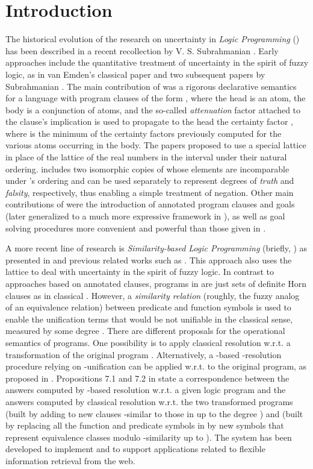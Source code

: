 \documentclass{sigplanconf}
\theoremstyle{definition}
\theoremstyle{plain}
\begin{document}
\section{Introduction} \label{Introduction}

The historical evolution of the research on uncertainty in {\em Logic Programming} () has been described in a recent recollection by V. S. Subrahmanian \cite{Sub07}. Early approaches include the quantitative  treatment of uncertainty in the spirit of fuzzy logic, as in van Emden's classical paper \cite{VE86} and two subsequent papers by Subrahmanian \cite{Sub87,Sub88}. The main contribution of \cite{VE86} was a rigorous declarative semantics for a  language with program clauses  of the form , where the head  is an atom, the body  is a conjunction of atoms, and the so-called {\em attenuation} factor  attached to the clause's implication is used to propagate
to the head the certainty factor , where  is the minimum of the certainty factors  previously computed for the various atoms occurring in the body. The papers \cite{Sub87,Sub88} proposed to use a special lattice  in place of the lattice of the real numbers in the interval  under their natural ordering.  includes two isomorphic copies of  whose elements are incomparable under 's ordering and can be used separately to represent degrees of {\em truth} and {\em falsity}, respectively, thus enabling a simple treatment of
negation. Other main contributions of \cite{Sub87,Sub88} were the introduction of annotated program clauses and goals (later generalized to a much more expressive framework in \cite{KS92}), as well as goal solving procedures more convenient and powerful than those given in \cite{VE86}.

A more recent line of research is {\em Similarity-based Logic Programming}  (briefly, ) as presented in \cite{Ses02} and previous related works such as \cite{AF99,GS99,FGS00,Ses01}. This approach also uses the lattice  to deal with uncertainty in the spirit of fuzzy logic. In contrast to approaches based on annotated clauses, programs in  are just sets of definite Horn clauses as in classical . However, a {\em similarity relation}  (roughly, the fuzzy analog of an equivalence relation) between predicate and function symbols is used to enable the
unification terms that would be not unifiable in the classical sense, measured by some degree . There are different proposals for the operational semantics of  programs. One possibility is to apply  classical  resolution w.r.t. a transformation of the original program \cite{GS99,Ses01,Ses02}. Alternatively, a -based -resolution procedure relying on -unification can be applied w.r.t. to the original program, as proposed in \cite{Ses02}. Propositions 7.1 and 7.2 in \cite{Ses02} state a correspondence between the answers computed by
-based  resolution w.r.t. a given logic program  and the answers computed by classical  resolution w.r.t. the two transformed programs  (built by adding to  new clauses -similar to those in  up to the degree ) and  (built by replacing all the function and predicate symbols in  by new symbols that represent
equivalence classes modulo -similarity up to ). The  system  \cite{LSS04} has been developed to implement  and to support applications related to flexible information retrieval from the web.
\end{document}
